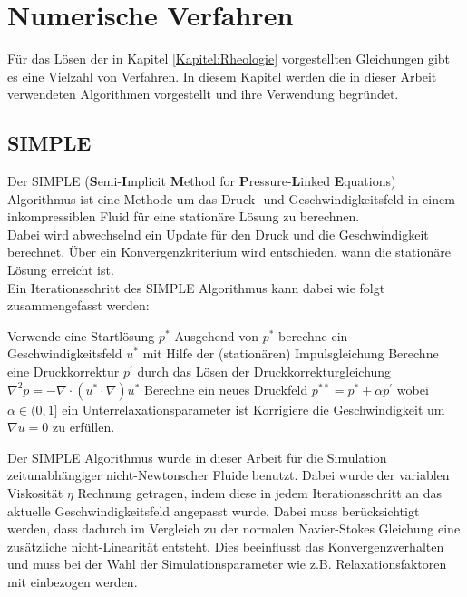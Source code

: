 \section{Numerische Verfahren}
\label{Kapitel:Numerik}
Für das Lösen der in Kapitel \ref{Kapitel:Rheologie} vorgestellten Gleichungen gibt es eine Vielzahl von Verfahren. In diesem Kapitel werden die in dieser Arbeit verwendeten Algorithmen vorgestellt und ihre Verwendung begründet.

\subsection{SIMPLE}
Der SIMPLE (\textbf{S}emi-\textbf{I}mplicit \textbf{M}ethod for \textbf{P}ressure-\textbf{L}inked \textbf{E}quations) Algorithmus  ist eine Methode um das Druck- und Geschwindigkeitsfeld in einem inkompressiblen Fluid für eine stationäre Lösung zu berechnen.\\
Dabei wird abwechselnd ein Update für den Druck und die Geschwindigkeit berechnet. Über ein Konvergenzkriterium wird entschieden, wann die stationäre Lösung erreicht ist.\\
Ein Iterationsschritt des SIMPLE Algorithmus kann dabei wie folgt zusammengefasst werden:
\begin{outline}[enumerate]
    \1 Verwende eine Startlösung $p^*$
    \1 Ausgehend von $p^*$ berechne ein Geschwindigkeitsfeld $u^*$ mit Hilfe der (stationären) Impulsgleichung
    \1 Berechne eine Druckkorrektur $p^{'}$ durch das Lösen der Druckkorrekturgleichung $\nabla^2p=-\nabla \cdot \left( u^*\cdot\nabla \right)u^*$
    \1 Berechne ein neues Druckfeld $p^{**}=p^*+\alpha p^{'}$ wobei $\alpha \in (0,1]$ ein Unterrelaxationsparameter ist
    \1 Korrigiere die Geschwindigkeit um $\nabla u=0$ zu erfüllen.
\end{outline}

Der SIMPLE Algorithmus wurde in dieser Arbeit für die Simulation zeitunabhängiger nicht-Newtonscher Fluide benutzt. Dabei wurde der variablen Viskosität $\eta$ Rechnung getragen, indem diese in jedem Iterationsschritt an das aktuelle Geschwindigkeitsfeld angepasst wurde. Dabei muss berücksichtigt werden, dass dadurch im Vergleich zu der normalen Navier-Stokes Gleichung eine zusätzliche nicht-Linearität entsteht. Dies beeinflusst das Konvergenzverhalten und muss bei der Wahl der Simulationsparameter wie z.B. Relaxationsfaktoren mit einbezogen werden.

